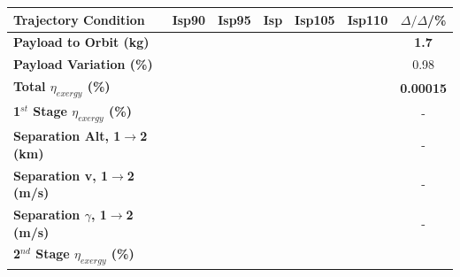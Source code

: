 \begin{table}[ht]
	\centering
\begin{tabular}{l c c c c c c} 
	\hline \textbf{Trajectory Condition}
	&Isp90
	&Isp95
	&Isp
	&Isp105
	&Isp110
	& $\Delta/\Delta$/\%
	\\
	\hline \textbf{Payload to Orbit (kg)}
	& \textbf{\PayloadToOrbitIspNinety}
	& \textbf{\PayloadToOrbitIspNinetyFive}
	& \textbf{\PayloadToOrbitIspStandard}
	& \textbf{\PayloadToOrbitIspOneHundredFive}
	& \textbf{\PayloadToOrbitIspOneHundredTen}
	&\textbf{1.7}
	\\
	\textbf{Payload Variation (\%)}
	& \PayloadVarIspNinety
	& \PayloadVarIspNinetyFive
	& \PayloadVarIspStandard
	& \PayloadVarIspOneHundredFive
	& \PayloadVarIspOneHundredTen
	&0.98
	\\
	\textbf{Total $\eta_{exergy}$ (\%)}
	& \textbf{\totalExergyEffIspNinety}
	& \textbf{\totalExergyEffIspNinetyFive}
	& \textbf{\totalExergyEffIspStandard}
	& \textbf{\totalExergyEffIspOneHundredFive}
	& \textbf{\totalExergyEffIspOneHundredTen}
	& \textbf{0.00015}
	\\
	\hline 
	\textbf{1$^{st}$ Stage $\eta_{exergy}$ (\%)}
	& \textbf{\firstExergyEffIspNinety}
	& \textbf{\firstExergyEffIspNinetyFive}
	& \textbf{\firstExergyEffIspStandard}
	& \textbf{\firstExergyEffIspOneHundredFive}
	& \textbf{\firstExergyEffIspOneHundredTen}
	& -
	\\
	\textbf{Separation Alt, 1$\rightarrow$2 (km)}
	& \firstsecondSeparationAltIspNinety
	& \firstsecondSeparationAltIspNinetyFive
	& \firstsecondSeparationAltIspStandard
	& \firstsecondSeparationAltIspOneHundredFive
	& \firstsecondSeparationAltIspOneHundredTen
	& -
	\\
	\textbf{Separation v, 1$\rightarrow$2 (m/s)}
	& \firstsecondSeparationvIspNinety
	& \firstsecondSeparationvIspNinetyFive
	& \firstsecondSeparationvIspStandard
	& \firstsecondSeparationvIspOneHundredFive
	& \firstsecondSeparationvIspOneHundredTen
	& -
	\\
	\textbf{Separation $\gamma$, 1$\rightarrow$2 (m/s)}
	& \firstsecondSeparationgammaIspNinety
	& \firstsecondSeparationgammaIspNinetyFive
	& \firstsecondSeparationgammaIspStandard
	& \firstsecondSeparationgammaIspOneHundredFive
	& \firstsecondSeparationgammaIspOneHundredTen
	& -
	\\
	\hline 
	\textbf{2$^{nd}$ Stage $\eta_{exergy}$ (\%)}
	& \textbf{\secondExergyEffIspNinety}
	& \textbf{\secondExergyEffIspNinetyFive}
	& \textbf{\secondExergyEffIspStandard}
	& \textbf{\secondExergyEffIspOneHundredFive}
	& \textbf{\secondExergyEffIspOneHundredTen}

\end{tabular}
\end{table}
